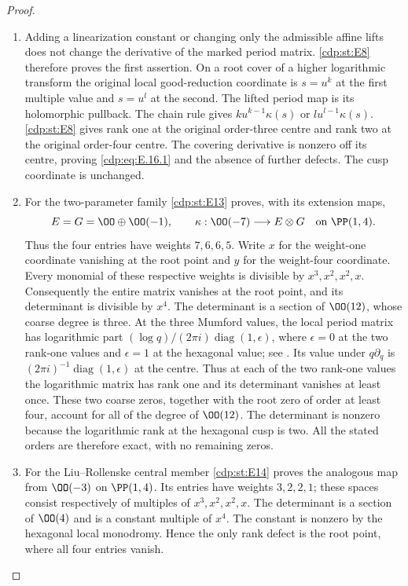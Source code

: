 \begin{proof}

\begin{enumerate}[label=\arabic*.,leftmargin=*]
\item Adding a linearization constant or changing only the admissible affine lifts does not change the derivative of the marked period matrix. \ref{cdp:st:E8} therefore proves the first assertion. On a root cover of a higher logarithmic transform the original local good-reduction coordinate is $s=u^k$ at the first multiple value and $s=u^l$ at the second. The lifted period map is its holomorphic pullback. The chain rule gives $k u^{k-1}\kappa(s)$ or $l u^{l-1}\kappa(s)$. \ref{cdp:st:E8} gives rank one at the original order-three centre and rank two at the original order-four centre. The covering derivative is nonzero off its centre, proving \eqref{cdp:eq:E.16.1} and the absence of further defects. The cusp coordinate is unchanged.

\item For the two-parameter family \ref{cdp:st:E13} proves, with its extension maps,
\[
 E=G=\OO\oplus\OO(-1),\qquad
 \kappa:\OO(-7)\longrightarrow E\otimes G
 \quad\text{on }\PP(1,4).
\]
Thus the four entries have weights $7,6,6,5$. Write $x$ for the weight-one coordinate vanishing at the root point and $y$ for the weight-four coordinate. Every monomial of these respective weights is divisible by $x^3,x^2,x^2,x$. Consequently the entire matrix vanishes at the root point, and its determinant is divisible by $x^4$. The determinant is a section of $\OO(12)$, whose coarse degree is three. At the three Mumford values, the local period matrix has logarithmic
part $(\log q)/(2\pi i)\operatorname{diag}(1,\epsilon)$, where
$\epsilon=0$ at the two rank-one values and $\epsilon=1$ at the
hexagonal value; see \cite[equation~(3.1), p.~6]{Viaclovsky2026Two}.
Its value under $q\partial_q$ is
$(2\pi i)^{-1}\operatorname{diag}(1,\epsilon)$ at the centre.
Thus at each of the two rank-one values the logarithmic matrix has rank one and its determinant vanishes at least once. These two coarse zeros, together with the root zero of order at least four, account for all of the degree of $\OO(12)$. The determinant is nonzero because the logarithmic rank at the hexagonal cusp is two. All the stated orders are therefore exact, with no remaining zeros.

\item For the Liu--Rollenske central member \ref{cdp:st:E14} proves the analogous map from $\OO(-3)$ on $\PP(1,4)$. Its entries have weights $3,2,2,1$; these spaces consist respectively of multiples of $x^3,x^2,x^2,x$. The determinant is a section of $\OO(4)$ and is a constant multiple of $x^4$. The constant is nonzero by the hexagonal local monodromy. Hence the only rank defect is the root point, where all four entries vanish.


\end{enumerate}
\end{proof}
